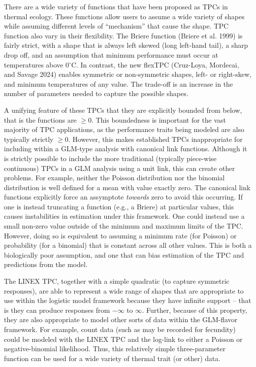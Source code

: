 \documentclass[
]{article}
\begin{document}
There are a wide variety of functions that have been proposed as TPCs in
thermal ecology. These functions allow users to assume a wide variety of
shapes while assuming different levels of ``mechanism'' that cause the
shape. TPC function also vary in their flexibility. The Briere function
(Briere et al. 1999) is fairly strict, with a shape that is always left
skewed (long left-hand tail), a sharp drop off, and an assumption that
minimum performance must occur at temperatures above 0\(^\circ\)C. In
contrast, the new flexTPC (Cruz-Loya, Mordecai, and Savage 2024) enables
symmetric or non-symmetric shapes, left- or right-skew, and minimum
temperatures of any value. The trade-off is an increase in the number of
parameters needed to capture the possible shapes.

A unifying feature of these TPCs that they are explicitly bounded from
below, that is the functions are \(\geq 0\). This boundedness is
important for the vast majority of TPC applications, as the performance
traits being modeled are also typically strictly \(\geq 0\). However,
this makes established TPCs inappropriate for including within a
GLM-type analysis with canonical link functions. Although it is strictly
possible to include the more traditional (typically piece-wise
continuous) TPCs in a GLM analysis using a unit link, this can create
other problems. For example, neither the Poisson distribution nor the
binomial distribution is well defined for a mean with value exactly
zero. The canonical link functions explicitly force an assymptote
\emph{towards} zero to avoid this occurring. If one is instead
truncating a function (e.g., a Briere) at particular values, this causes
instabilities in estimation under this framework. One could instead use
a small non-zero value outside of the minimum and maximum limits of the
TPC. However, doing so is equivalent to assuming a minimum rate (for
Poisson) or probability (for a binomial) that is constant across all
other values. This is both a biologically poor assumption, and one that
can bias estimation of the TPC and predictions from the model.

The LINEX TPC, together with a simple quadratic (to capture symmetric
responses), are able to represent a wide range of shapes that are
appropriate to use within the logistic model framework because they have
infinite support -- that is they can produce responses from \(-\infty\)
to \(\infty\). Further, because of this property, they are also
appropriate to model other sorts of data within the GLM-flavor
framework. For example, count data (such as may be recorded for
fecundity) could be modeled with the LINEX TPC and the log-link to
either a Poisson or negative-binomial likelihood. Thus, this relatively
simple three-parameter function can be used for a wide variety of
thermal trait (or other) data.
\end{document}
